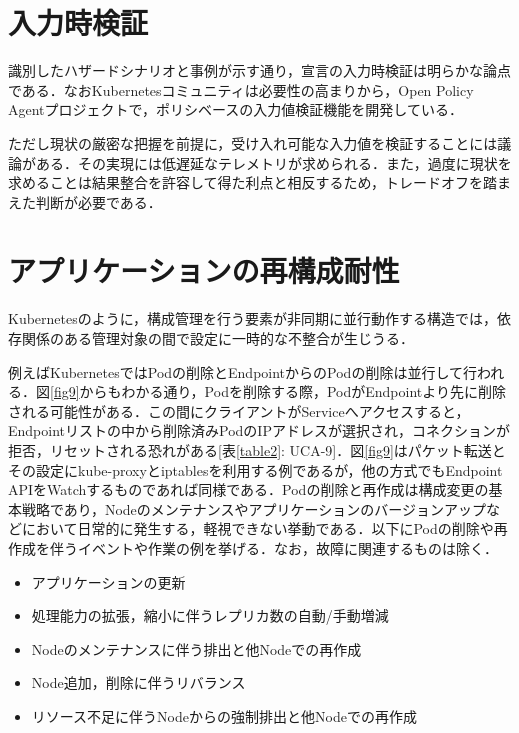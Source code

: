 \documentclass[12pt,a4j]{ujreport}
\begin{document}
\section{入力時検証}
識別したハザードシナリオと事例が示す通り，宣言の入力時検証は明らかな論点である．なおKubernetesコミュニティは必要性の高まりから，Open Policy Agentプロジェクト\cite{ref29}で，ポリシベースの入力値検証機能を開発している．

ただし現状の厳密な把握を前提に，受け入れ可能な入力値を検証することには議論がある．その実現には低遅延なテレメトリが求められる．また，過度に現状を求めることは結果整合を許容して得た利点と相反するため，トレードオフを踏まえた判断が必要である．

\section{アプリケーションの再構成耐性}
\label{sec:アプリケーションの再構成耐性}
Kubernetesのように，構成管理を行う要素が非同期に並行動作する構造では，依存関係のある管理対象の間で設定に一時的な不整合が生じうる．

例えばKubernetesではPodの削除とEndpointからのPodの削除は並行して行われる．図\ref{fig9}からもわかる通り，Podを削除する際，PodがEndpointより先に削除される可能性がある．この間にクライアントがServiceへアクセスすると，Endpointリストの中から削除済みPodのIPアドレスが選択され，コネクションが拒否，リセットされる恐れがある[表\ref{table2}: UCA-9]．図\ref{fig9}はパケット転送とその設定にkube-proxyとiptablesを利用する例であるが，他の方式でもEndpoint APIをWatchするものであれば同様である．Podの削除と再作成は構成変更の基本戦略であり，Nodeのメンテナンスやアプリケーションのバージョンアップなどにおいて日常的に発生する，軽視できない挙動である．以下にPodの削除や再作成を伴うイベントや作業の例を挙げる．なお，故障に関連するものは除く．

\begin{itemize}
  \item アプリケーションの更新
  \item 処理能力の拡張，縮小に伴うレプリカ数の自動/手動増減
  \item Nodeのメンテナンスに伴う排出と他Nodeでの再作成
  \item Node追加，削除に伴うリバランス
  \item リソース不足に伴うNodeからの強制排出と他Nodeでの再作成
\end{itemize}
\end{document}
